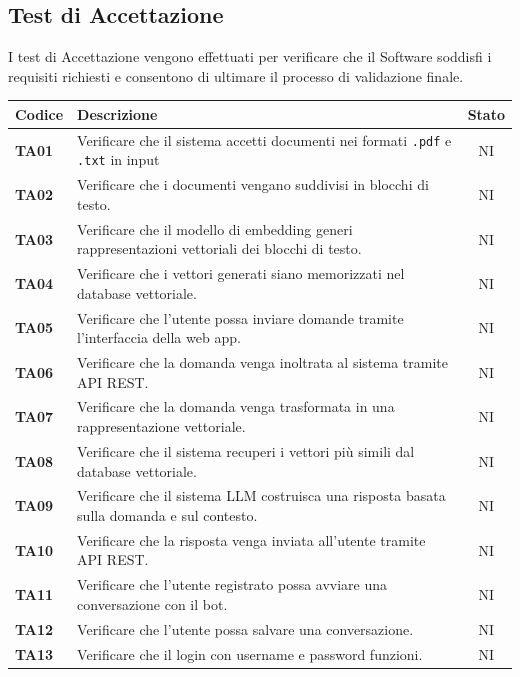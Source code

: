 \documentclass{article}
\begin{document}
\newpage
\subsection{Test di Accettazione} %
I test di Accettazione vengono effettuati per verificare che il Software soddisfi i requisiti richiesti e consentono di ultimare il processo di validazione finale.

\begin{longtable}{|>{\centering\arraybackslash}m{}|>{\raggedright\arraybackslash}m{}|c|}
    \hline
    \textbf{Codice} & \textbf{Descrizione} & \textbf{Stato} \\
    \hline
    \textbf{TA01} & Verificare che il sistema accetti documenti nei formati \texttt{.pdf} e \texttt{.txt} in input & NI \\
    \hline
    \textbf{TA02} & Verificare che i documenti vengano suddivisi in blocchi di testo. & NI \\
    \hline
    \textbf{TA03} & Verificare che il modello di embedding generi rappresentazioni vettoriali dei blocchi di testo. & NI\\
    \hline
    \textbf{TA04} & Verificare che i vettori generati siano memorizzati nel database vettoriale. & NI\\
    \hline
    \textbf{TA05} & Verificare che l’utente possa inviare domande tramite l’interfaccia della web app.& NI\\
    \hline
    \textbf{TA06} & Verificare che la domanda venga inoltrata al sistema tramite API REST. & NI\\
    \hline
    \textbf{TA07} & Verificare che la domanda venga trasformata in una rappresentazione vettoriale. & NI\\
    \hline
    \textbf{TA08} & Verificare che il sistema recuperi i vettori più simili dal database vettoriale. & NI\\
    \hline
    \textbf{TA09} & Verificare che il sistema LLM costruisca una risposta basata sulla domanda e sul contesto. & NI\\
    \hline
    \textbf{TA10} & Verificare che la risposta venga inviata all’utente tramite API REST.& NI\\
    \hline
    \textbf{TA11} & Verificare che l’utente registrato possa avviare una conversazione con il bot.& NI\\
    \hline
    \textbf{TA12} & Verificare che l’utente possa salvare una conversazione.& NI\\
    \hline
    \textbf{TA13} & Verificare che il login con username e password funzioni.& NI\\

\end{longtable}
\end{document}
